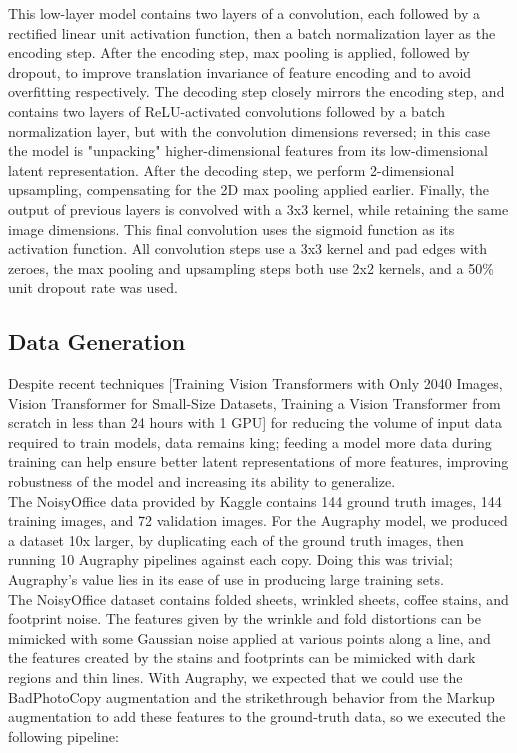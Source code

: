 \documentclass[runningheads]{llncs}
\begin{document}
This low-layer model contains two layers of a convolution, each followed by a rectified linear unit activation function, then a batch normalization layer as the encoding step. After the encoding step, max pooling is applied, followed by dropout, to improve translation invariance of feature encoding and to avoid overfitting respectively. The decoding step closely mirrors the encoding step, and contains two layers of ReLU-activated convolutions followed by a batch normalization layer, but with the convolution dimensions reversed; in this case the model is "unpacking" higher-dimensional features from its low-dimensional latent representation. After the decoding step, we perform 2-dimensional upsampling, compensating for the 2D max pooling applied earlier. Finally, the output of previous layers is convolved with a 3x3 kernel, while retaining the same image dimensions. This final convolution uses the sigmoid function as its activation function. All convolution steps use a 3x3 kernel and pad edges with zeroes, the max pooling and upsampling steps both use 2x2 kernels, and a 50\% unit dropout rate was used.

\subsection{Data Generation}
Despite recent techniques [Training Vision Transformers with Only 2040 Images, Vision Transformer for Small-Size Datasets, Training a Vision Transformer from scratch in less than 24 hours with 1 GPU] for reducing the volume of input data required to train models, data remains king; feeding a model more data during training can help ensure better latent representations of more features, improving robustness of the model and increasing its ability to generalize.\\

The NoisyOffice data provided by Kaggle contains 144 ground truth images, 144 training images, and 72 validation images. For the Augraphy model, we produced a dataset 10x larger, by duplicating each of the ground truth images, then running 10 Augraphy pipelines against each copy. Doing this was trivial; Augraphy's value lies in its ease of use in producing large training sets.\\

The NoisyOffice dataset contains folded sheets, wrinkled sheets, coffee stains, and footprint noise. The features given by the wrinkle and fold distortions can be mimicked with some Gaussian noise applied at various points along a line, and the features created by the stains and footprints can be mimicked with dark regions and thin lines. With Augraphy, we expected that we could use the BadPhotoCopy augmentation and the strikethrough behavior from the Markup augmentation to add these features to the ground-truth data, so we executed the following pipeline:
\end{document}
